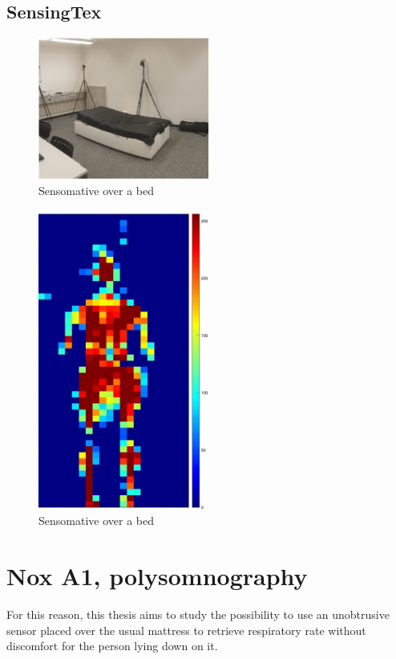 \subsection{SensingTex}
\begin{figure}[h]
    \centering
    \includegraphics[width=0.5\textwidth]{img/sensingtex.png}
    \caption{Sensomative over a bed}
    \label{fig:sensingtex}
\end{figure}

\begin{figure}[h]
    \centering
    \includegraphics[width=0.5\textwidth]{img/sensingtex_2.jpg}
    \caption{Sensomative over a bed}
    \label{fig:sensingtexData}
\end{figure}


\section{Nox A1, polysomnography}
For this reason, this thesis aims to study the possibility to use an unobtrusive sensor placed over the usual mattress to retrieve 
respiratory rate without discomfort for the person lying down on it. 


